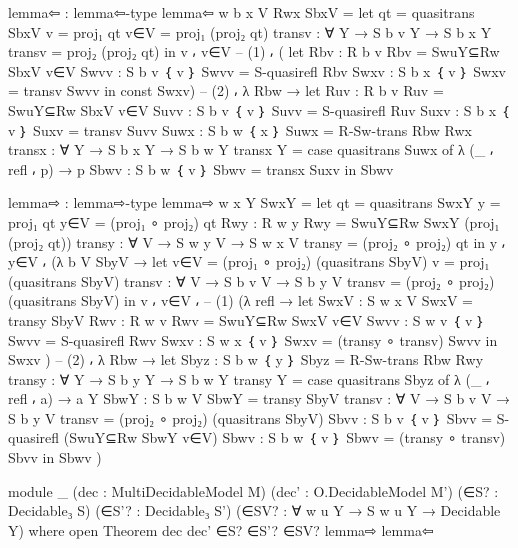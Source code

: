 \begin{spverbatim}
  lemma⇦ : lemma⇦-type
  lemma⇦ {w} {b} {x} {V} Rwx SbxV =
    let
      qt = quasitrans SbxV
      v = proj₁ qt
      v∈V = proj₁ (proj₂ qt)
      transv : ∀ {Y} → S b v Y → S b x Y
      transv = proj₂ (proj₂ qt)
    in v ⸴ v∈V
      -- (1)
      ⸴ (
      let
        Rbv : R b v
        Rbv = SwuY⊆Rw SbxV v∈V
        Swvv : S b v ｛ v ｝
        Swvv = S-quasirefl Rbv
        Swxv : S b x ｛ v ｝
        Swxv = transv Swvv
        in const Swxv)
      -- (2)
      ⸴ λ { Rbw →
        let
          Ruv : R b v
          Ruv = SwuY⊆Rw SbxV v∈V
          Suvv : S b v ｛ v ｝
          Suvv = S-quasirefl Ruv
          Suxv : S b x ｛ v ｝
          Suxv = transv Suvv
          Suwx : S b w ｛ x ｝
          Suwx = R-Sw-trans Rbw Rwx
          transx : ∀ {Y} → S b x Y → S b w Y
          transx {Y} = case quasitrans Suwx of
            λ { (_ ⸴ refl ⸴ p) → p}
          Sbwv : S b w ｛ v ｝
          Sbwv = transx Suxv
        in Sbwv}

  lemma⇨ : lemma⇨-type
  lemma⇨ {w} {x} {Y} SwxY =
    let
      qt = quasitrans SwxY
      y = proj₁ qt
      y∈V = (proj₁ ∘ proj₂) qt
      Rwy : R w y
      Rwy = SwuY⊆Rw SwxY (proj₁ (proj₂ qt))
      transy : ∀ {V} → S w y V → S w x V
      transy = (proj₂ ∘ proj₂) qt
    in y ⸴ y∈V ⸴
      (λ {b} {V} SbyV →
    let v∈V = (proj₁ ∘ proj₂) (quasitrans SbyV)
        v = proj₁ (quasitrans SbyV)
        transv : ∀ {V} → S b v V → S b y V
        transv = (proj₂ ∘ proj₂) (quasitrans SbyV)
    in v ⸴ v∈V ⸴
      -- (1)
      (λ {refl →
        let
            SwxV : S w x V
            SwxV = transy SbyV
            Rwv : R w v
            Rwv = SwuY⊆Rw SwxV v∈V
            Swvv : S w v ｛ v ｝
            Swvv = S-quasirefl Rwv
            Swxv : S w x ｛ v ｝
            Swxv = (transy ∘ transv) Swvv
        in Swxv
        })
      -- (2)
      ⸴ λ { Rbw →
        let
          Sbyz : S b w ｛ y ｝
          Sbyz = R-Sw-trans Rbw Rwy
          transy : ∀ {Y} → S b y Y → S b w Y
          transy {Y} = case quasitrans Sbyz of
            λ { (_ ⸴ refl ⸴ a) → a {Y}  }
          SbwY : S b w V
          SbwY = transy SbyV
          transv : ∀ {V} → S b v V → S b y V
          transv = (proj₂ ∘ proj₂) (quasitrans SbyV)
          Sbvv : S b v ｛ v ｝
          Sbvv = S-quasirefl (SwuY⊆Rw SbwY v∈V)
          Sbwv : S b w ｛ v ｝
          Sbwv = (transy ∘ transv) Sbvv
        in Sbwv
      })

  module _
    (dec : MultiDecidableModel M)
    (dec' : O.DecidableModel M')
    (∈S? : Decidable₃ S)
    (∈S'? : Decidable₃ S')
    (∈SV? : ∀ {w u Y} → S w u Y → Decidable Y)
    where
    open Theorem dec dec' ∈S? ∈S'? ∈SV? lemma⇨ lemma⇦



\end{spverbatim}

